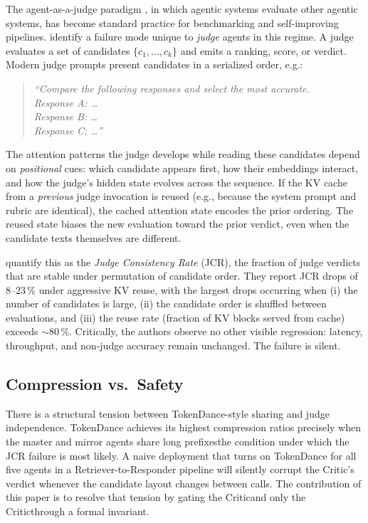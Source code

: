 \documentclass[10pt,twocolumn]{article}
\begin{document}
The agent-as-a-judge paradigm \cite{agentjudge}, in which agentic systems
evaluate other agentic systems, has become standard practice for
benchmarking and self-improving pipelines. \cite{jcrfailure} identify a
failure mode unique to \emph{judge} agents in this regime.
A judge evaluates a set of candidates $\{c_1, \ldots, c_k\}$ and emits a
ranking, score, or verdict. Modern judge prompts present candidates in a
serialized order, e.g.:
\begin{quote}
\small
\textit{``Compare the following responses and select the most accurate.\\
Response A: \ldots \\ Response B: \ldots \\ Response C: \ldots''}
\end{quote}
The attention patterns the judge develops while reading these candidates
depend on \emph{positional} cues: which candidate appears first, how their
embeddings interact, and how the judge's hidden state evolves across the
sequence. If the KV cache from a \emph{previous} judge invocation is reused
(e.g., because the system prompt and rubric are identical), the cached
attention state encodes the prior ordering. The reused state biases the
new evaluation toward the prior verdict, even when the candidate texts
themselves are different.

\cite{jcrfailure} quantify this as the \emph{Judge Consistency Rate} (JCR),
the fraction of judge verdicts that are stable under permutation of
candidate order. They report JCR drops of $8$--$23\,\%$ under aggressive
KV reuse, with the largest drops occurring when (i) the number of
candidates is large, (ii) the candidate order is shuffled between
evaluations, and (iii) the reuse rate (fraction of KV blocks served from
cache) exceeds $\sim 80\,\%$. Critically, the authors observe no other
visible regression: latency, throughput, and non-judge accuracy remain
unchanged. The failure is silent.

\subsection{Compression vs.\ Safety}
\label{sec:bg:tension}

There is a structural tension between TokenDance-style sharing and judge
independence. TokenDance achieves its highest compression ratios precisely
when the master and mirror agents share long prefixes\textemdash the
condition under which the JCR failure is most likely. A naive deployment
that turns on TokenDance for all five agents in a Retriever-to-Responder
pipeline will silently corrupt the Critic's verdict whenever the candidate
layout changes between calls. The contribution of this paper is to resolve
that tension by gating the Critic\textemdash and only the
Critic\textemdash through a formal invariant.
\end{document}
